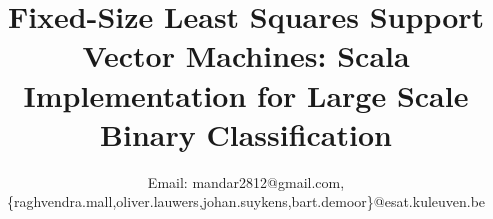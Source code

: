 \documentclass[conference, cmex10]{IEEEtran}
\begin{document}
%
\title{Fixed-Size Least Squares Support Vector Machines: Scala Implementation for Large Scale Binary Classification}


\author{

Email: mandar2812@gmail.com,\{raghvendra.mall,oliver.lauwers,johan.suykens,bart.demoor\}@esat.kuleuven.be}

% 








\maketitle
\end{document}
